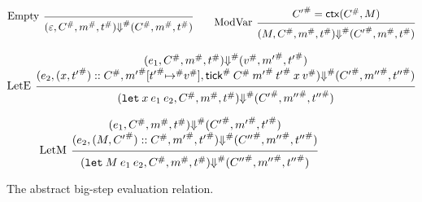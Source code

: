 \documentclass[acmsmall,screen,review]{acmart}
\theoremstyle{definition}
\newcommand*{\cons}{::}
\newcommand*{\A}[1]{{#1}^{\#}}
\newcommand*{\mem}{m}
\newcommand*{\tick}{\mathsf{tick}}
\newcommand*{\modctx}{\mathsf{ctx}}
\begin{document}
\begin{figure}[htb]
  \[
    \begin{prooftree}
      \infer[left label=Empty]0{
      (\varepsilon, \A{C}, \A{\mem}, \A{t})
      \A{\Downarrow}
      (\A{C}, \A{\mem}, \A{t})
      }
    \end{prooftree}\qquad
    \begin{prooftree}
      \hypo{\A{C'}=\modctx(\A{C},M)}
      \infer[left label=ModVar]1{
      (M, \A{C}, \A{\mem}, \A{t})
      \A{\Downarrow}
      (\A{C'}, \A{\mem}, \A{t})
      }
    \end{prooftree}
  \]

  \[
    \begin{prooftree}
      \hypo{
        \begin{matrix}
          (e_{1}, \A{C}, \A{\mem}, \A{t})
          \A\Downarrow
          (\A{v}, \A{\mem'}, \A{t'}) \\
          (e_{2}, (x, \A{t'})\cons \A{C}, \A{\mem'}[\A{t'}\A{\mapsto} \A{v}], \A{\tick}\:\A{C}\:\A{\mem'}\:\A{t'}\:x\:\A{v})
          \A\Downarrow
          (\A{C'}, \A{\mem''}, \A{t''})
        \end{matrix}
      }
      \infer[left label=LetE]1{
      (\mathtt{let}\:x\:e_1\:e_2, \A{C}, \A{\mem}, \A{t})
      \A\Downarrow
      (\A{C'}, \A{\mem''}, \A{t''})
      }
    \end{prooftree}
  \]

  \[
    \begin{prooftree}
      \hypo{
        \begin{matrix}
          (e_{1}, \A{C}, \A{\mem}, \A{t})
          \A\Downarrow
          (\A{C'}, \A{\mem'}, \A{t'}) \\
          (e_{2}, (M, \A{C'})\cons\A{C}, \A{\mem'}, \A{t'})
          \A\Downarrow
          (\A{C''}, \A{\mem''}, \A{t''})
        \end{matrix}
      }
      \infer[left label=LetM]1{
      (\mathtt{let}\:M\:e_{1}\:e_{2}, \A{C}, \A{\mem}, \A{t})
      \A\Downarrow
      (\A{C''}, \A{\mem''}, \A{t''})
      }
    \end{prooftree}
  \]
  \caption{The abstract big-step evaluation relation.}
  \label{fig:abseval}
\end{figure}
\end{document}
